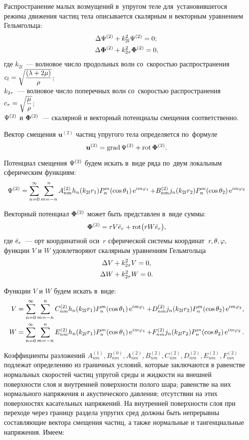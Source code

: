Распространение малых возмущений в~упругом теле для~установившегося режима движения частиц тела описывается скалярным и векторным уравнением Гельмгольца:
\begin{align}
\Lap\P^{(2)} &+ k_{2l}^2\P^{(2)} = 0;\label{Helmholtz_scalar}\\
\Lap\F^{(2)} &+ k_{2\t}^2\F^{(2)} = 0,\label{Helmholtz_vector}
\end{align}
где $k_{2l}$~--- волновое число продольных волн со~скоростью распространения \break 
$c_l = \sqrt{\df{(\la + 2\mu)}\r}$;\\
$k_{2\t}$~--- волновое число поперечных волн со~скоростью распространения
$c_\t = \sqrt{\df\mu\r}$;\\
$\P^{(2)}$ и $\F^{(2)}$~--- скалярной и векторный потенциалы смещения соответственно.

Вектор смещения $\mathbf{u}^{(2)}$ частиц упругого тела определяется по~формуле
$$
\mathbf{u}^{(2)} = \grad \P^{(2)} + \rot \F^{(2)}.
$$

Потенциал смещения $\P^{(2)}$ будем искать в~виде ряда по~двум локальным сферическим функциям:
$$
\P^{(2)} = \sum\limits_{n=0}^\infty \sum\limits_{m=-n}^n A_{nm}^{(2)} h_n(k_{2l}r_1)P_n^m(\cos\Q_1)\e^{im\f_1} + B_{nm}^{(2)} j_n(k_{2l}r_2)P_n^m(\cos\Q_2)\e^{im\f_2}
$$

Векторный потенциал $\F^{(2)}$ может быть представлен в~виде суммы:
$$
\F^{(2)} = rV\er + \rot\bigl(rW\er\bigr),
$$
где $\er$~--- орт координатной оси~$r$ сферической системы координат~$r, \Q, \f,$\\
функции $V$ и $W$ удовлетворяют скалярным уравнениям Гельмгольца
\begin{align}
\Lap V &+ k_{2\t}^2 V = 0,\\
\Lap W &+ k_{2\t}^2 W = 0.
\end{align}

Функции $V$ и $W$ будем искать в~виде:
\begin{align}
V = \sum\limits_{n=0}^\infty \sum\limits_{m=-n}^n C_{nm}^{(2)} h_n(k_{2l}r_1)P_n^m(\cos\Q_1)\e^{im\f_1} + D_{nm}^{(2)} j_n(k_{2l}r_2)P_n^m(\cos\Q_2)\e^{im\f_2},\\
W = \sum\limits_{n=0}^\infty \sum\limits_{m=-n}^n E_{nm}^{(2)} h_n(k_{2l}r_1)P_n^m(\cos\Q_1)\e^{im\f_1} + F_{nm}^{(2)} j_n(k_{2l}r_2)P_n^m(\cos\Q_2)\e^{im\f_2}.
\end{align}

Коэффициенты разложений $A_{nm}^{(1)}, B_{nm}^{(0)}, A_{nm}^{(2)}, B_{nm}^{(2)}, C_{nm}^{(2)}, D_{nm}^{(2)}, E_{nm}^{(2)}, F_{nm}^{(2)}$ подлежат определению из граничных условий, которые заключаются в равенстве нормальных скоростей частиц упругой среды и жидкости на внешней поверхности слоя и внутренней поверхности полого шара; равенстве на них нормального напряжения и акустического давления; отсутствии на этих поверхностях касательных напряжений. На внутренней поверхности слоя при переходе через границу раздела упругих сред должны быть непрерывны составляющие вектора смещения частиц, а также нормальные и тангенциальные напряжения. Имеем:


